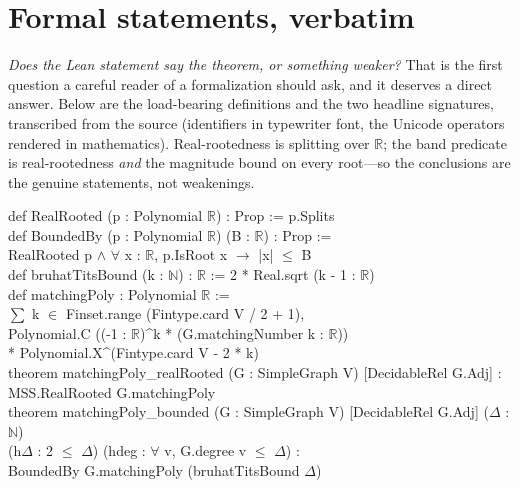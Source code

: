 \documentclass[11pt]{article}
\newcommand{\R}{\mathbb{R}}
\begin{document}
\appendix
\section{Formal statements, verbatim}
\label{sec:formal}

\emph{Does the Lean statement say the theorem, or something weaker?} That is the
first question a careful reader of a formalization should ask, and it deserves a
direct answer. Below are the load-bearing definitions and the two headline
signatures, transcribed from the source (identifiers in typewriter font, the
Unicode operators rendered in mathematics). Real-rootedness is splitting over
$\R$; the band predicate is real-rootedness \emph{and} the magnitude bound on every
root---so the conclusions are the genuine statements, not weakenings.

\begin{tcolorbox}[colframe=ggteal,colback=ggband!25,arc=2pt,boxrule=0.8pt,left=8pt,right=8pt]
\ttfamily\small\setlength{\parindent}{0pt}
def RealRooted (p : Polynomial $\R$) : Prop := p.Splits\\[2pt]
def BoundedBy (p : Polynomial $\R$) (B : $\R$) : Prop :=\\
\hspace*{1.5em}RealRooted p $\wedge$ $\forall$ x : $\R$, p.IsRoot x $\rightarrow$ |x| $\leq$ B\\[2pt]
def bruhatTitsBound (k : $\mathbb{N}$) : $\R$ := 2 * Real.sqrt (k - 1 : $\R$)\\[4pt]
def matchingPoly : Polynomial $\R$ :=\\
\hspace*{1.5em}$\sum$ k $\in$ Finset.range (Fintype.card V / 2 + 1),\\
\hspace*{3em}Polynomial.C ((-1 : $\R$)\^{}k * (G.matchingNumber k : $\R$))\\
\hspace*{3em}* Polynomial.X\^{}(Fintype.card V - 2 * k)\\[6pt]
theorem matchingPoly\_realRooted (G : SimpleGraph V) [DecidableRel G.Adj] :\\
\hspace*{1.5em}MSS.RealRooted G.matchingPoly\\[4pt]
theorem matchingPoly\_bounded (G : SimpleGraph V) [DecidableRel G.Adj] ($\Delta$ : $\mathbb{N}$)\\
\hspace*{1.5em}(h$\Delta$ : 2 $\leq$ $\Delta$) (hdeg : $\forall$ v, G.degree v $\leq$ $\Delta$) :\\
\hspace*{1.5em}BoundedBy G.matchingPoly (bruhatTitsBound $\Delta$)
\end{tcolorbox}
\end{document}
